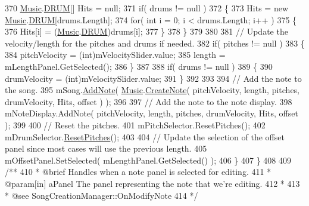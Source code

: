 \begin{DoxyCodeInclude}
370             \hyperlink{class_music}{Music}.\hyperlink{group___music_enums_gade475b4382c7066d1af13e7c13c029b6}{DRUM}[] Hits = null;
371             \textcolor{keywordflow}{if}( drums != null )
372             \{
373                 Hits = \textcolor{keyword}{new} \hyperlink{class_music}{Music}.\hyperlink{group___music_enums_gade475b4382c7066d1af13e7c13c029b6}{DRUM}[drums.Length];
374                 \textcolor{keywordflow}{for}( \textcolor{keywordtype}{int} i = 0; i < drums.Length; i++ )
375                 \{
376                     Hits[i] = (\hyperlink{class_music}{Music}.\hyperlink{group___music_enums_gade475b4382c7066d1af13e7c13c029b6}{DRUM})drums[i];
377                 \}
378             \}
379 
380 
381             \textcolor{comment}{// Update the velocity/length for the pitches and drums if needed.}
382             \textcolor{keywordflow}{if}( pitches != null )
383             \{
384                 pitchVelocity = (int)mVelocitySlider.value;
385                 length = mLengthPanel.GetSelected();
386             \}
387 
388             \textcolor{keywordflow}{if}( drums != null )
389             \{
390                 drumVelocity = (int)mVelocitySlider.value;
391             \}
392 
393 
394             \textcolor{comment}{// Add the note to the song.}
395             mSong.\hyperlink{group___song_pub_func_gab7c8fe4dc29f5ae7b7728c583fe51f7e}{AddNote}( \hyperlink{class_music}{Music}.\hyperlink{group___music_stat_func_gaaf74885e43eb623f64f961985fadcd08}{CreateNote}( pitchVelocity, length, pitches, 
      drumVelocity, Hits, offset ) );
396 
397             \textcolor{comment}{// Add the note to the note display.}
398             mNoteDisplay.AddNote( pitchVelocity, length, pitches, drumVelocity, Hits, offset );
399 
400             \textcolor{comment}{// Reset the pitches.}
401             mPitchSelector.ResetPitches();
402             mDrumSelector.\hyperlink{group___s_c___p_s_c_pub_func_ga678ef561c5418e4bf43a5f9ed753f0f0}{ResetPitches}();
403 
404             \textcolor{comment}{// Update the selection of the offset panel since most cases will use the previous length.}
405             mOffsetPanel.SetSelected( mLengthPanel.GetSelected() );
406         \}
407     \}
408 \textcolor{comment}{}
409 \textcolor{comment}{    /**}
410 \textcolor{comment}{     * @brief Handles when a note panel is selected for editing.}
411 \textcolor{comment}{     * @param[in] aPanel The panel representing the note that we're editing.}
412 \textcolor{comment}{     * }
413 \textcolor{comment}{     * @see SongCreationManager::OnModifyNote}
414 \textcolor{comment}{    */}

\end{DoxyCodeInclude}
